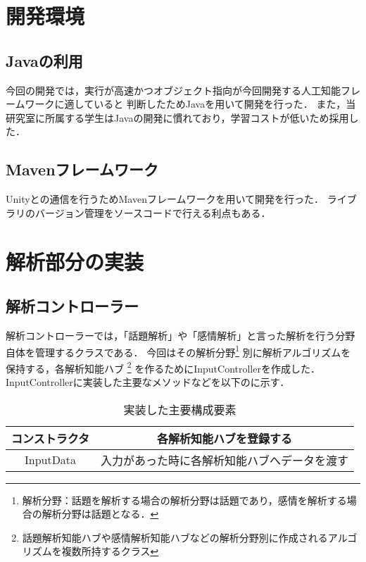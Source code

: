 \section{開発環境}
\subsection{Javaの利用}
今回の開発では，実行が高速かつオブジェクト指向が今回開発する人工知能フレームワークに適していると
判断したためJavaを用いて開発を行った．
また，当研究室に所属する学生はJavaの開発に慣れており，学習コストが低いため採用した．

\subsection{Mavenフレームワーク}
Unityとの通信を行うためMavenフレームワークを用いて開発を行った．
ライブラリのバージョン管理をソースコードで行える利点もある．

\section{解析部分の実装}
\subsection{解析コントローラー}
解析コントローラーでは，「話題解析」や「感情解析」と言った解析を行う分野自体を管理するクラスである．
今回はその解析分野\footnote{解析分野：話題を解析する場合の解析分野は話題であり，感情を解析する場合の解析分野は話題となる．}
別に解析アルゴリズムを保持する，各解析知能ハブ
\footnote{話題解析知能ハブや感情解析知能ハブなどの解析分野別に作成されるアルゴリズムを複数所持するクラス}
を作るためにInputControllerを作成した．
InputControllerに実装した主要なメソッドなどを以下のに示す．

\begin{table}[tbh]
	\caption{実装した主要構成要素} \label{tab:InputController}
	\begin{center}
		\begin{tabular}[htb]{c|c}
		\hline
		コンストラクタ & 各解析知能ハブを登録する \\
		\hline
		InputData & 入力があった時に各解析知能ハブへデータを渡す \\
		\hline
		\end{tabular}
	\end{center}
\end{table}


